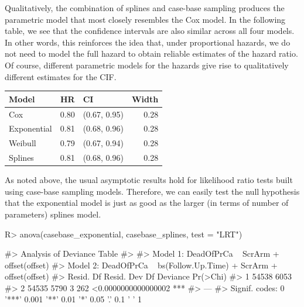 \documentclass[
]{jss}
\begin{document}
Qualitatively, the combination of splines and case-base sampling
produces the parametric model that most closely resembles the Cox model.
In the following table, we see that the confidence intervals are also
similar across all four models. In other words, this reinforces the idea
that, under proportional hazards, we do not need to model the full
hazard to obtain reliable estimates of the hazard ratio. Of course,
different parametric models for the hazards give rise to qualitatively
different estimates for the CIF.

\begin{CodeChunk}
\begin{table}[H]
\centering
\begin{tabular}{lrlr}
\toprule
Model & HR & CI & Width\\
\midrule
Cox & 0.80 & (0.67, 0.95) & 0.28\\
Exponential & 0.81 & (0.68, 0.96) & 0.28\\
Weibull & 0.79 & (0.67, 0.94) & 0.28\\
Splines & 0.81 & (0.68, 0.96) & 0.28\\
\bottomrule
\end{tabular}
\end{table}

\end{CodeChunk}

As noted above, the usual asymptotic results hold for likelihood ratio
tests built using case-base sampling models. Therefore, we can easily
test the null hypothesis that the exponential model is just as good as
the larger (in terms of number of parameters) splines model.

\begin{CodeChunk}

\begin{CodeInput}
R> anova(casebase_exponential, casebase_splines, test = "LRT")
\end{CodeInput}

\begin{CodeOutput}
#> Analysis of Deviance Table
#> 
#> Model 1: DeadOfPrCa ~ ScrArm + offset(offset)
#> Model 2: DeadOfPrCa ~ bs(Follow.Up.Time) + ScrArm + offset(offset)
#>   Resid. Df Resid. Dev Df Deviance            Pr(>Chi)    
#> 1     54538       6053                                    
#> 2     54535       5790  3      262 <0.0000000000000002 ***
#> ---
#> Signif. codes:  0 '***' 0.001 '**' 0.01 '*' 0.05 '.' 0.1 ' ' 1
\end{CodeOutput}
\end{CodeChunk}
\end{document}
